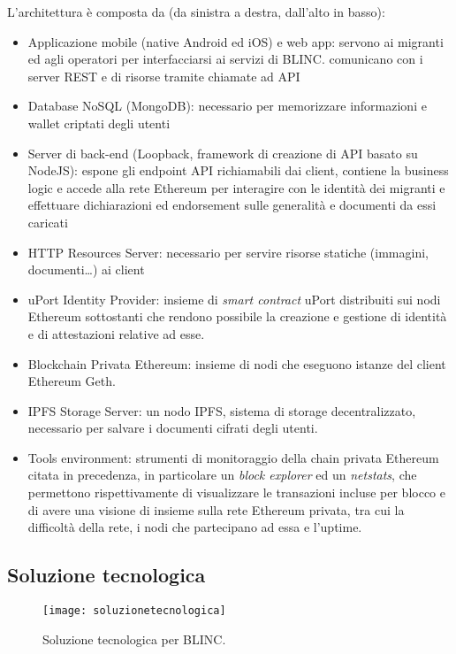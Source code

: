 L’architettura è composta da (da sinistra a destra, dall’alto in basso):
\begin{itemize}
    \item Applicazione mobile (native Android ed iOS) e web app: servono ai migranti ed agli operatori per interfacciarsi ai servizi di BLINC.
    comunicano con i server REST e di risorse tramite chiamate ad API
    \item Database NoSQL (MongoDB): necessario per memorizzare informazioni e wallet criptati degli utenti
    \item Server di back-end (Loopback, framework di creazione di API basato su NodeJS): espone gli endpoint API richiamabili
    dai client, contiene la business logic e accede alla rete Ethereum per interagire
    con le identità dei migranti e effettuare dichiarazioni ed endorsement sulle generalità e documenti da essi caricati
    \item HTTP Resources Server: necessario per servire risorse statiche (immagini, documenti…) ai client
    \item uPort Identity Provider: insieme di \emph{smart contract} uPort distribuiti sui nodi Ethereum sottostanti che rendono
    possibile la creazione e gestione di identità e di attestazioni relative ad esse.
    \item Blockchain Privata Ethereum: insieme di nodi che eseguono istanze del client Ethereum Geth.
    \item IPFS Storage Server: un nodo IPFS, sistema di storage decentralizzato, necessario per salvare i documenti cifrati degli utenti.
    \item Tools environment: strumenti di monitoraggio della chain privata Ethereum citata in precedenza, in particolare un \emph{block explorer} ed un
    \emph{netstats}, che permettono rispettivamente di visualizzare le transazioni incluse per blocco e di avere una visione di insieme sulla rete Ethereum privata,
    tra cui la difficoltà della rete, i nodi che partecipano ad essa e l'uptime.
\end{itemize}

\subsection{Soluzione tecnologica}

\begin{figure}[!ht]
    \texttt{[image: soluzionetecnologica]}
    \caption{Soluzione tecnologica per BLINC.}
    \label{fig:soluzionetecnologica}
\end{figure}

